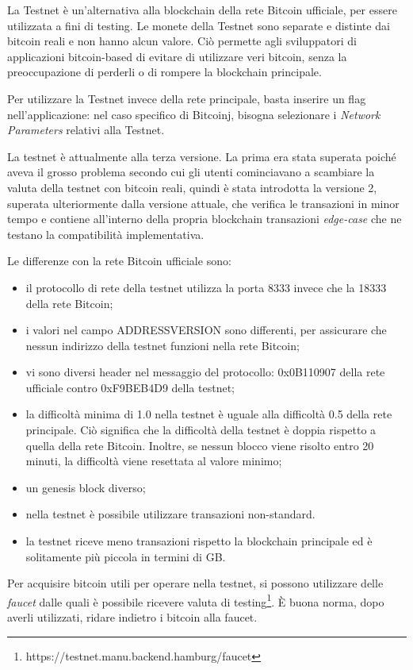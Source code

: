 La Testnet è un'alternativa alla blockchain della rete Bitcoin ufficiale, per essere utilizzata a fini di testing. Le monete della Testnet sono separate e distinte dai bitcoin reali e non hanno alcun valore. Ciò permette agli sviluppatori di applicazioni bitcoin-based di evitare di utilizzare veri bitcoin, senza la preoccupazione di perderli o di rompere la blockchain principale.

Per utilizzare la Testnet invece della rete principale, basta inserire un flag nell'applicazione: nel caso specifico di Bitcoinj, bisogna selezionare i \textit{Network Parameters} relativi alla Testnet.

La testnet è attualmente alla terza versione. La prima era stata superata poiché aveva il grosso problema secondo cui gli utenti cominciavano a scambiare la valuta della testnet con bitcoin reali, quindi è stata introdotta la versione 2, superata ulteriormente dalla versione attuale, che verifica le transazioni in minor tempo e contiene all'interno della propria blockchain transazioni \textit{edge-case} che ne testano la compatibilità implementativa.

Le differenze con la rete Bitcoin ufficiale sono:
\begin{itemize}
    \item il protocollo di rete della testnet utilizza la porta 8333 invece che la 18333 della rete Bitcoin;
    \item i valori nel campo ADDRESSVERSION sono differenti, per assicurare che nessun indirizzo della testnet funzioni nella rete Bitcoin;
    \item vi sono diversi header nel messaggio del protocollo: 0x0B110907 della rete ufficiale contro 0xF9BEB4D9 della testnet;
    \item la difficoltà minima di 1.0 nella testnet è uguale alla difficoltà 0.5 della rete principale. Ciò significa che la difficoltà della testnet è doppia rispetto a quella della rete Bitcoin. Inoltre, se nessun blocco viene risolto entro 20 minuti, la difficoltà viene resettata al valore minimo;
    \item un genesis block diverso;
    \item nella testnet è possibile utilizzare transazioni non-standard.
    \item la testnet riceve meno transazioni rispetto la blockchain principale ed è solitamente più piccola in termini di GB.
\end{itemize}

Per acquisire bitcoin utili per operare nella testnet, si possono utilizzare delle \textit{faucet} dalle quali è possibile ricevere valuta di testing\footnote{https://testnet.manu.backend.hamburg/faucet}. È buona norma, dopo averli utilizzati, ridare indietro i bitcoin alla faucet.

